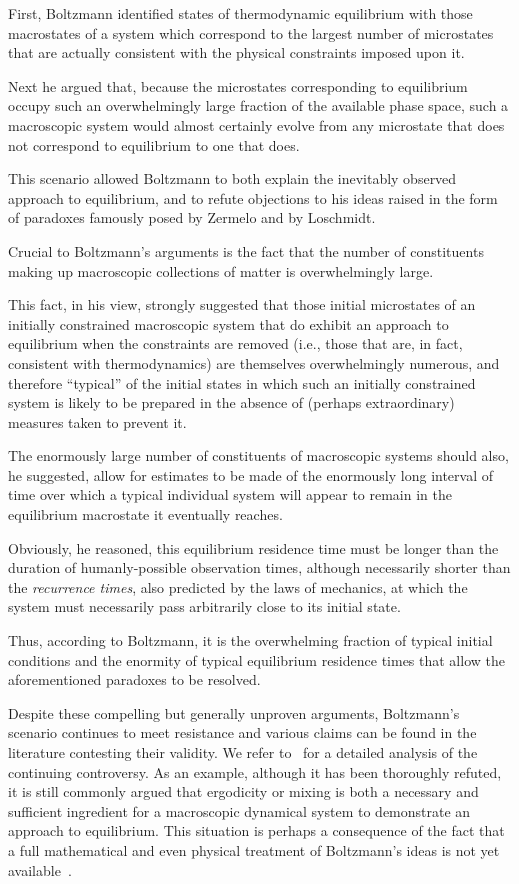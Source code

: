 \documentclass{article}
\numberwithin{equation}{section}
\begin{document}
First, Boltzmann identified
states of thermodynamic equilibrium with those macrostates of a system
which correspond to the largest number of microstates that are actually
consistent with the physical constraints imposed upon it.

Next he argued that, because the microstates corresponding to
equilibrium occupy such an overwhelmingly large fraction of the available
phase space, such a macroscopic system would almost certainly evolve from any microstate that does
not correspond to equilibrium to one that does.

This scenario allowed Boltzmann to both explain the inevitably observed
approach to equilibrium,
and to refute objections to his ideas raised in the form of
paradoxes famously posed by Zermelo and by Loschmidt.

Crucial to Boltzmann's arguments is the fact
that the number of constituents making up macroscopic collections of matter is
overwhelmingly large.

This fact, in his view, strongly suggested that those initial microstates of an initially constrained  macroscopic system that do exhibit an approach to equilibrium when the constraints are removed (i.e., those that are, in fact, consistent with thermodynamics) are themselves overwhelmingly numerous, and therefore ``typical'' of the initial states in which such an initially constrained system is likely to be prepared in the absence of (perhaps extraordinary) measures taken to prevent it.

The enormously large number of constituents of macroscopic systems
should also, he suggested, allow for estimates to
be made of the enormously long interval of time over which a
typical individual system will appear to remain in the equilibrium
macrostate it eventually reaches.

Obviously, he reasoned, this equilibrium residence time must be
longer than the duration of humanly-possible observation times,
although necessarily shorter than the \emph{recurrence times},
also predicted by  the laws of mechanics, at which the system
must necessarily pass arbitrarily close to its initial state.

Thus, according to Boltzmann, it is the overwhelming fraction of typical initial
conditions and the enormity of typical equilibrium residence times
that allow the aforementioned paradoxes to be resolved.

Despite these compelling but generally unproven arguments, Boltzmann's
scenario continues to meet resistance and various claims can be
found in the literature contesting their validity.
We refer to~\cite{Br96, Le08} for a detailed analysis of the continuing
controversy. As an example, although it has been thoroughly refuted, it is still commonly argued that
ergodicity or mixing is both a necessary
and sufficient ingredient for a macroscopic dynamical system to demonstrate an approach to
equilibrium. This situation is perhaps a consequence of the fact that a full mathematical and even physical treatment of Boltzmann's ideas is not
yet available~\cite{Ka59, Ru91, Le08, Vi14}.
\end{document}

